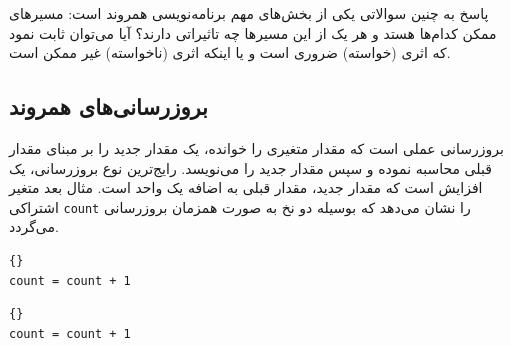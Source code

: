 \documentclass{book}
\begin{document}
پاسخ به چنین سوالاتی یکی از بخش‌های مهم برنامه‌نویسی همروند است: مسیرهای ممکن کدام‌ها هستد و هر یک از این مسیرها چه تاثیراتی دارند؟ 
    آیا می‌توان ثابت نمود که اثری (خواسته) ضروری است و یا اینکه اثری (ناخواسته) غیر ممکن است. 


\subsection {بروزرسانی‌های همروند}

    بروزرسانی عملی است که مقدار متغیری را خوانده، یک مقدار جدید را بر مبنای مقدار قبلی محاسبه نموده و سپس مقدار جدید را می‌نویسد. 
    رایج‌ترین نوع بروزرسانی، یک افزایش  است که مقدار جدید، مقدار قبلی به اضافه یک واحد است. 
    مثال بعد متغیر اشتراکی \texttt{count} را نشان می‌دهد که بوسیله دو نخ به صورت همزمان بروزرسانی می‌گردد. 

\begin{latin}
\begin{minipage}[t]{2in}
\begin{latin}
\begin{lstlisting}[title=\rl{نخ \lr{A}}]{}
count = count + 1
\end{lstlisting}
\end{latin}
\end{minipage}
\hfill
\begin{minipage}[t]{2in}
\begin{latin}
\begin{lstlisting}[title=\rl{نخ \lr{B}}]{}
count = count + 1
\end{lstlisting}
\end{latin}
\end{minipage}
\end{latin}
\end{document}
